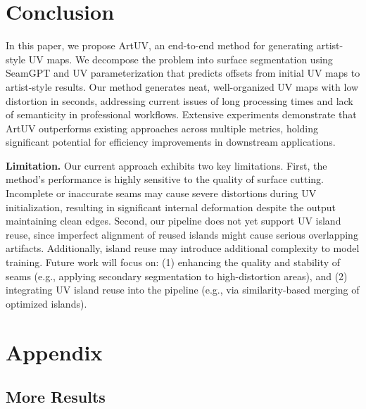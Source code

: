\documentclass{article}
\begin{document}
\section{Conclusion}
In this paper, we propose ArtUV, an end-to-end method for generating artist-style UV maps. We decompose the problem into surface segmentation using SeamGPT and UV parameterization that predicts offsets from initial UV maps to artist-style results. Our method generates neat, well-organized UV maps with low distortion in seconds, addressing current issues of long processing times and lack of semanticity in professional workflows. Extensive experiments demonstrate that ArtUV outperforms existing approaches across multiple metrics, holding significant potential for efficiency improvements in downstream applications.

\textbf{Limitation.}
Our current approach exhibits two key limitations. First, the method's performance is highly sensitive to the quality of surface cutting. Incomplete or inaccurate seams may cause severe distortions during UV initialization, resulting in significant internal deformation despite the output maintaining clean edges. Second, our pipeline does not yet support UV island reuse, since imperfect alignment of reused islands might cause serious overlapping artifacts. Additionally, island reuse may introduce additional complexity to model training. Future work will focus on: (1) enhancing the quality and stability of seams (e.g., applying secondary segmentation to high-distortion areas), and (2) integrating UV island reuse into the pipeline (e.g., via similarity-based merging of optimized islands).


\appendix

\section{Appendix}

\subsection{More Results}
\end{document}
